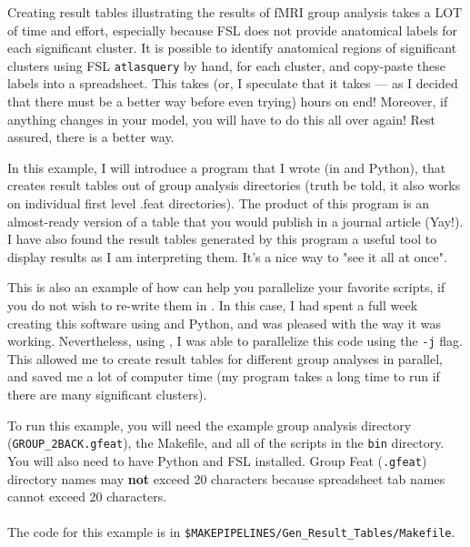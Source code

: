 
Creating result tables illustrating the results of fMRI group analysis takes a LOT of time and effort, especially because FSL does not provide anatomical labels for each significant cluster. It is possible to identify anatomical regions of significant clusters using FSL \texttt{atlasquery} by hand, for each cluster, and copy-paste these labels into a spreadsheet. This takes (or, I speculate that it takes --- as I decided that there must be a better way before even trying) hours on end! Moreover, if anything changes in your model, you will have to do this all over again! Rest assured, there is a better way.

In this example, I will introduce a program that I wrote (in \bashn{} and Python), that  creates result tables out of group analysis directories (truth be told, it also works on individual first level .feat directories). The product of this program is an almost-ready version of a table that you would publish in a journal article (Yay!). I have also found the result tables generated by this program a useful tool to display results as I am interpreting them. It's a nice way to "see it all at once".

This is also an example of how \maken{} can help you parallelize your favorite scripts, if you do not wish to re-write them in \maken{}. In this case, I had spent a full week creating this software using \bashn{} and Python, and was pleased with the way it was working. Nevertheless, using \maken{}, I was able to parallelize this code using the \texttt{-j} flag. This allowed me to create result tables for different group analyses in parallel, and saved me a lot of computer time (my program takes a long time to run if there are many significant clusters). 

To run this example, you will need the example group analysis directory (\texttt{GROUP_2BACK.gfeat}), the Makefile, and all of the scripts in the \texttt{bin} directory. You will also need to have Python and FSL installed. Group Feat (\texttt{.gfeat}) directory names may \textbf{not} exceed 20 characters because spreadsheet tab names cannot exceed 20 characters. 

\paragraph{}The code for this example is in \texttt{\$MAKEPIPELINES/Gen_Result_Tables/Makefile}.

